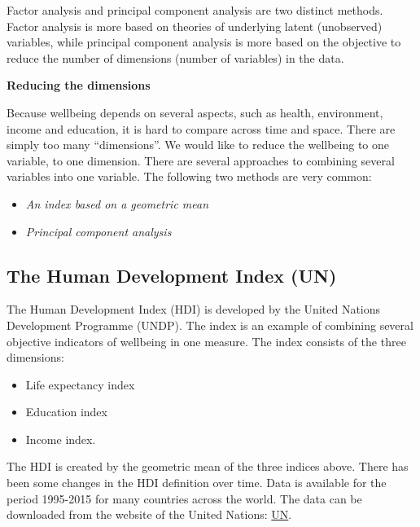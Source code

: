 \documentclass[
]{book}
\providecommand{\tightlist}{%
  \setlength{\itemsep}{0pt}\setlength{\parskip}{0pt}}
\begin{document}
Factor analysis and principal component analysis are two distinct methods. Factor analysis is more based on theories of underlying latent (unobserved) variables, while principal component analysis is more based on the objective to reduce the number of dimensions (number of variables) in the data.

\begin{myblock}
\textbf{Reducing the dimensions}

Because wellbeing depends on several aspects, such as health,
environment, income and education, it is hard to compare across time and
space. There are simply too many ``dimensions''. We would like to reduce
the wellbeing to one variable, to one dimension. There are several
approaches to combining several variables into one variable. The
following two methods are very common:

\begin{itemize}
\tightlist
\item
  \emph{An index based on a geometric mean}
\item
  \emph{Principal component analysis}
\end{itemize}
\end{myblock}

\hypertarget{the-human-development-index-un}{%
\subsection*{The Human Development Index (UN)}\label{the-human-development-index-un}}

The Human Development Index (HDI) is developed by the United Nations Development Programme (UNDP). The index is an example of combining several objective indicators of wellbeing in one measure. The index consists of the three dimensions:

\begin{itemize}
\tightlist
\item
  Life expectancy index
\item
  Education index
\item
  Income index.
\end{itemize}

The HDI is created by the geometric mean of the three indices above. There has been some changes in the HDI definition over time. Data is available for the period 1995-2015 for many countries across the world. The data can be downloaded from the website of the United Nations: \href{http://worldhappiness.report/}{UN}.
\end{document}
